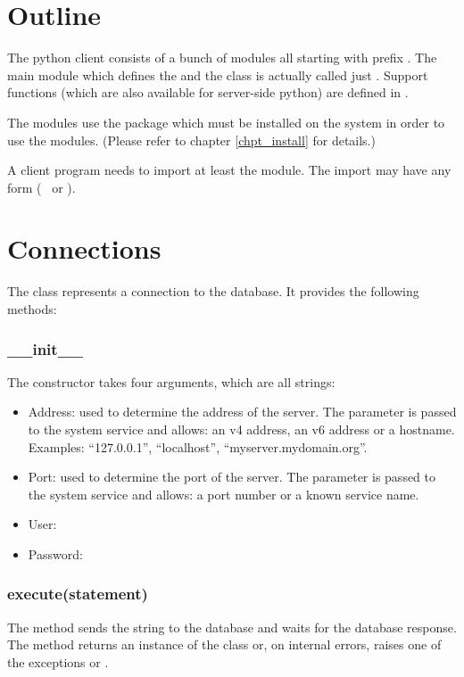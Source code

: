 \section{Outline}
The python client consists of a bunch
of modules all starting with prefix .
The main module which defines
the  and the  class
is actually called just .
Support functions (which are also available
for server-side python) are defined in
.

The modules use the package 
which must be installed on the system in order
to use the  modules.
(Please refer to chapter
\ref{chpt_install} for details.)

A client program needs to import at least
the  module. The import may have
any form (\ie\  or
).

\section{Connections}
The  class represents
a  connection to the
database. It provides the following 
methods:
\subsubsection{\_\_init\_\_}
The constructor takes four arguments,
which are all strings:
\begin{itemize}
\item Address:
used to determine the address of the server.
The parameter is passed to the system service
 and allows:
an v4 address,
an v6 address or
a hostname.
Examples: ``127.0.0.1'', ``localhost'',
``myserver.mydomain.org''.

\item Port:
used to determine the port of the server.
The parameter is passed to the system service
 and allows:
a port number or a known service name.

\item User:
\item Password:
\end{itemize}

\subsubsection{execute(statement)}
The method sends the string  to the database
and waits for the database response.
The method returns an instance of the  class
or, on internal errors, raises one of the exceptions
 or .

